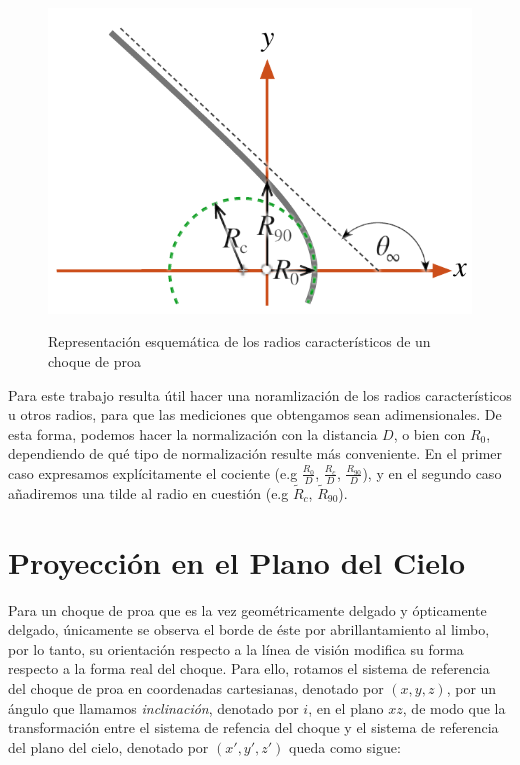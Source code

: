 \begin{figure}
  \includegraphics[width=\linewidth]{./Figures/characteristic-radii}
  \label{fig:char-radii}
  \caption{Representación esquemática de los radios característicos
  de un choque de proa}
\end{figure}
Para este trabajo resulta útil hacer una noramlización de los radios
característicos u otros radios, para que las mediciones que obtengamos
sean adimensionales. De esta forma, podemos hacer la normalización con
la distancia $D$, o bien con $R_0$, dependiendo de qué tipo de
normalización resulte más conveniente. En el primer caso expresamos
explícitamente el cociente (e.g $\frac{R_0}{D}$, $\frac{R_c}{D}$,
$\frac{R_{90}}{D}$), y en el segundo caso añadiremos una tilde al
radio en cuestión (e.g $\tilde{R}_c$, $\tilde{R}_{90}$). 

\section{Proyección en el Plano del Cielo}
\label{sec:projection}

Para un choque de proa que es la vez geométricamente delgado y
ópticamente delgado, únicamente se observa el borde de éste por
abrillantamiento al limbo, por lo tanto, su orientación respecto a
la línea de visión modifica su forma respecto a la forma real del
choque. Para ello, rotamos el sistema de referencia del choque de proa
en coordenadas cartesianas, denotado por $(x, y, z)$, por un ángulo
que llamamos \textit{inclinación}, denotado por $i$, en el plano $xz$,
de modo que la transformación entre el sistema de refencia del choque
y el sistema de referencia del plano del cielo, denotado por
$(x', y', z')$ queda como sigue:


